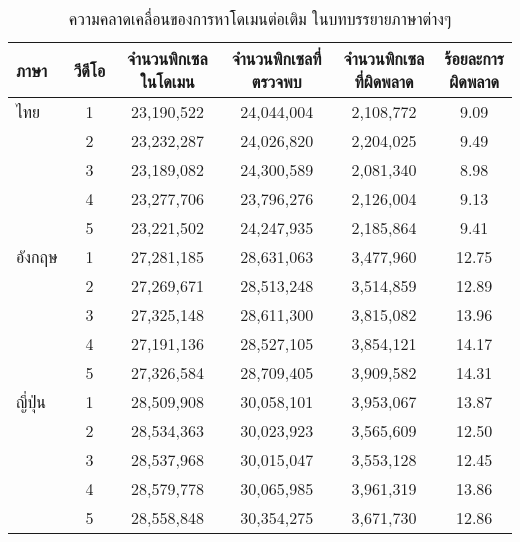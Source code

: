 \begin{table}[H]
    \centering
    \footnotesize
    \begin{tabular}[ht]{|l|c|c|c|c|c|}
        \hline
        ภาษา  & วีดีโอ & จำนวนพิกเซลในโดเมน & จำนวนพิกเซลที่ตรวจพบ & จำนวนพิกเซลที่ผิดพลาด & ร้อยละการผิดพลาด \\
        \hline
        ไทย & 1 & 23,190,522  & 24,044,004 & 2,108,772 &9.09\\
             & 2 & 23,232,287 & 24,026,820 & 2,204,025 & 9.49\\
            & 3 & 23,189,082 & 24,300,589 & 2,081,340 & 8.98\\
            & 4 & 23,277,706 & 23,796,276  & 2,126,004 & 9.13\\
            & 5 & 23,221,502 & 24,247,935 & 2,185,864 & 9.41\\
        \hline
        อังกฤษ & 1 & 27,281,185 & 28,631,063 & 3,477,960  & 12.75\\
        & 2 & 27,269,671 & 28,513,248 & 3,514,859 & 12.89\\
        & 3 & 27,325,148 & 28,611,300 & 3,815,082 & 13.96\\
        & 4 & 27,191,136 & 28,527,105 & 3,854,121 & 14.17\\
        & 5 & 27,326,584 & 28,709,405 & 3,909,582 & 14.31\\
        \hline
        ญี่ปุ่น & 1 & 28,509,908 & 30,058,101 &  3,953,067 & 13.87\\
        & 2 & 28,534,363  & 30,023,923 & 3,565,609 & 12.50\\
        & 3 & 28,537,968 & 30,015,047 & 3,553,128 & 12.45\\
        & 4 & 28,579,778 & 30,065,985 & 3,961,319 & 13.86\\
        & 5 & 28,558,848 & 30,354,275 & 3,671,730 & 12.86\\
        \hline
    \end{tabular}
    \caption{ความคลาดเคลื่อนของการหาโดเมนต่อเติม ในบทบรรยายภาษาต่างๆ}
\end{table}